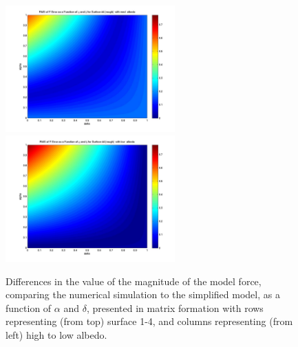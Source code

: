 \begin{description}
\begin{figure}[!ht]
\begin{minipage}[t]{200mm}
    \includegraphics[width=65mm]{figs/sda/F_error_albedo__med_surf__rough.jpg}
    \includegraphics[width=65mm]{figs/sda/F_error_albedo__low_surf__rough.jpg}
  \end{minipage}
    \caption{Differences in the value of the magnitude of the model force, comparing the numerical simulation
    to the simplified model, as a function of $\alpha$ and $\delta$,
    presented in matrix formation with rows representing (from top) surface
    1-4, and columns representing (from left) high to low albedo.}
    \label{fig:ivv_sda_alpha_delta_F}
  \end{figure}


\end{description}

